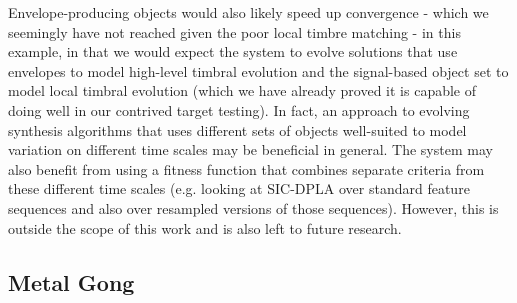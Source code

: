 \documentclass[12pt]{report} 	%
\numberwithin{figure}{chapter}
\numberwithin{table}{chapter}
\numberwithin{equation}{chapter}
\begin{document}
\begin{flushleft}
Envelope-producing objects would also likely speed up convergence - which we seemingly have not reached given the poor local timbre matching - in this example, in that we would expect the system to evolve solutions that use envelopes to model high-level timbral evolution and the signal-based object set to model local timbral evolution (which we have already proved it is capable of doing well in our contrived target testing). In fact, an approach to evolving synthesis algorithms that uses different sets of objects well-suited to model variation on different time scales may be beneficial in general. The system may also benefit from using a fitness function that combines separate criteria from these different time scales (e.g. looking at SIC-DPLA over standard feature sequences and also over resampled versions of those sequences). However, this is outside the scope of this work and is also left to future research.

\vspace{12pt}
\subsection{Metal Gong}


\end{flushleft}
\end{document}
